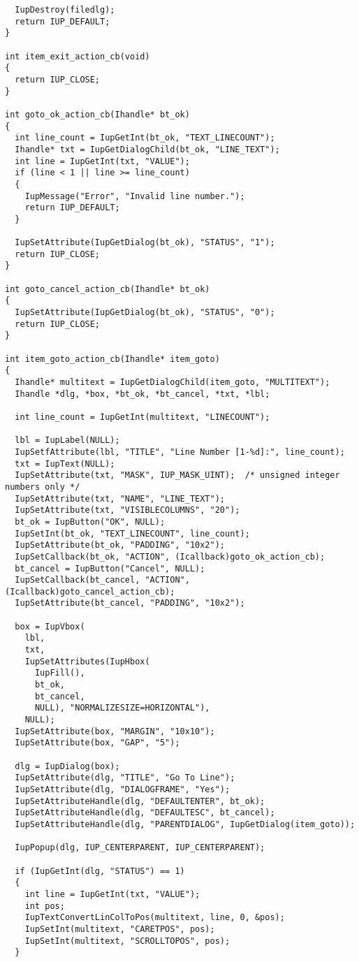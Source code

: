 \documentclass{ctexart}
\begin{document}
\begin{lstlisting}
  IupDestroy(filedlg);
  return IUP_DEFAULT;
}

int item_exit_action_cb(void)
{
  return IUP_CLOSE;
}

int goto_ok_action_cb(Ihandle* bt_ok)
{
  int line_count = IupGetInt(bt_ok, "TEXT_LINECOUNT");
  Ihandle* txt = IupGetDialogChild(bt_ok, "LINE_TEXT");
  int line = IupGetInt(txt, "VALUE");
  if (line < 1 || line >= line_count)
  {
    IupMessage("Error", "Invalid line number.");
    return IUP_DEFAULT;
  }

  IupSetAttribute(IupGetDialog(bt_ok), "STATUS", "1");
  return IUP_CLOSE;
}

int goto_cancel_action_cb(Ihandle* bt_ok)
{
  IupSetAttribute(IupGetDialog(bt_ok), "STATUS", "0");
  return IUP_CLOSE;
}

int item_goto_action_cb(Ihandle* item_goto)
{
  Ihandle* multitext = IupGetDialogChild(item_goto, "MULTITEXT");
  Ihandle *dlg, *box, *bt_ok, *bt_cancel, *txt, *lbl;

  int line_count = IupGetInt(multitext, "LINECOUNT");

  lbl = IupLabel(NULL);
  IupSetfAttribute(lbl, "TITLE", "Line Number [1-%d]:", line_count);
  txt = IupText(NULL);
  IupSetAttribute(txt, "MASK", IUP_MASK_UINT);  /* unsigned integer numbers only */
  IupSetAttribute(txt, "NAME", "LINE_TEXT");
  IupSetAttribute(txt, "VISIBLECOLUMNS", "20");
  bt_ok = IupButton("OK", NULL);
  IupSetInt(bt_ok, "TEXT_LINECOUNT", line_count);
  IupSetAttribute(bt_ok, "PADDING", "10x2");
  IupSetCallback(bt_ok, "ACTION", (Icallback)goto_ok_action_cb);
  bt_cancel = IupButton("Cancel", NULL);
  IupSetCallback(bt_cancel, "ACTION", (Icallback)goto_cancel_action_cb);
  IupSetAttribute(bt_cancel, "PADDING", "10x2");

  box = IupVbox(
    lbl,
    txt,
    IupSetAttributes(IupHbox(
      IupFill(),
      bt_ok,
      bt_cancel,
      NULL), "NORMALIZESIZE=HORIZONTAL"),
    NULL);
  IupSetAttribute(box, "MARGIN", "10x10");
  IupSetAttribute(box, "GAP", "5");

  dlg = IupDialog(box);
  IupSetAttribute(dlg, "TITLE", "Go To Line");
  IupSetAttribute(dlg, "DIALOGFRAME", "Yes");
  IupSetAttributeHandle(dlg, "DEFAULTENTER", bt_ok);
  IupSetAttributeHandle(dlg, "DEFAULTESC", bt_cancel);
  IupSetAttributeHandle(dlg, "PARENTDIALOG", IupGetDialog(item_goto));

  IupPopup(dlg, IUP_CENTERPARENT, IUP_CENTERPARENT);

  if (IupGetInt(dlg, "STATUS") == 1)
  {
    int line = IupGetInt(txt, "VALUE");
    int pos;
    IupTextConvertLinColToPos(multitext, line, 0, &pos);
    IupSetInt(multitext, "CARETPOS", pos);
    IupSetInt(multitext, "SCROLLTOPOS", pos);
  }


\end{lstlisting}
\end{document}
